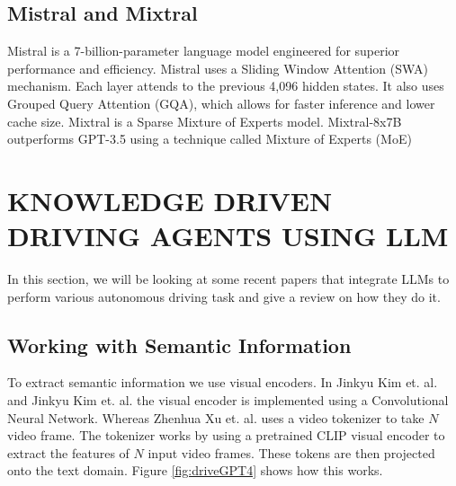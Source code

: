 \begin{spacing}{1.5}
\begin{sloppypar}
\subsection{Mistral and Mixtral}
Mistral \cite{jiang2023mistral} is a 7-billion-parameter language model engineered for superior performance and efficiency. Mistral uses a Sliding Window Attention (SWA) mechanism. Each layer attends to the previous 4,096 hidden states. It also uses Grouped Query Attention (GQA), which allows for faster inference and lower cache size.
Mixtral is a Sparse Mixture of Experts model. Mixtral-8x7B outperforms GPT-3.5 using a technique called Mixture of Experts (MoE)



\section{KNOWLEDGE DRIVEN DRIVING AGENTS USING LLM}
In this section, we will be looking at some recent papers that integrate LLMs to perform various autonomous driving task and give a review on how they do it. 
\pagebreak
\subsection{Working with Semantic Information}
To extract semantic information we use visual encoders. In Jinkyu Kim et. al. \cite{grounding} and Jinkyu Kim et. al. \cite{textual} the visual encoder is implemented using a Convolutional Neural Network.
Whereas Zhenhua Xu et. al. \cite{xu2023drivegpt4} uses a video tokenizer to take $N$ video frame. The tokenizer works by using a pretrained CLIP visual encoder to extract the features of $N$ input video frames. These tokens are then projected onto the text domain. Figure \ref{fig:driveGPT4} shows how this works.


\end{sloppypar}
\end{spacing}

